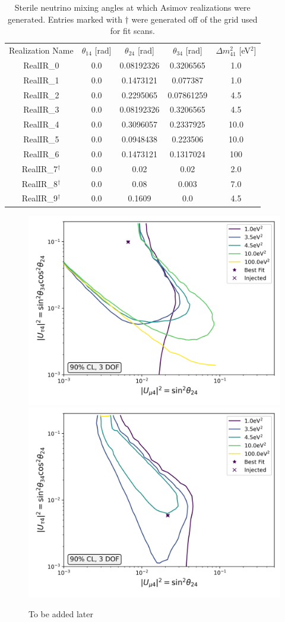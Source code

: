 \documentclass[main.tex]{subfiles}
\begin{document}
\begin{table}
    \centering
    \begin{tabular}{c | cccc}\rowcolor{blue!25}
            Realization Name & $\theta_{14}$ [rad] & $\theta_{24}$ [rad] & $\theta_{34}$ [rad] & $\Delta m_{41}^{2}$ [eV$^{2}$] \\
            RealIR\_0& 0.0  & 0.08192326 & 0.3206565 & 1.0 \\
            RealIR\_1& 0.0  & 0.1473121 & 0.077387 & 1.0\\
            RealIR\_2& 0.0  & 0.2295065 & 0.07861259 & 4.5\\
            RealIR\_3& 0.0  & 0.08192326 & 0.3206565 & 4.5\\
            RealIR\_4& 0.0  & 0.3096057 & 0.2337925 & 10.0\\
            RealIR\_5& 0.0  & 0.0948438 & 0.223506 & 10.0\\
            RealIR\_6& 0.0  & 0.1473121 & 0.1317024 & 100\\
            RealIR\_7$^{\dag}$ & 0.0  & 0.02 & 0.02 & 2.0\\
            RealIR\_8$^{\dag}$ & 0.0  & 0.08 & 0.003 & 7.0\\
            RealIR\_9$^{\dag}$ & 0.0  & 0.1609 & 0.0 & 4.5
    \end{tabular}
    \caption{Sterile neutrino mixing angles at which Asimov realizations were generated. Entries marked with $\dag$ were generated off of the grid used for fit scans.}\label{table:injected_signals}
\end{table}

\begin{figure}
    \centering
    \includegraphics[width=0.45\linewidth]{figures/inject_recover_RealIR_0_sterile_1_cl0.9_dof3.png}%
    \includegraphics[width=0.45\linewidth]{figures/inject_recover_RealIR_1_sterile_1_cl0.9_dof3.png}
    \caption{To be added later}
\end{figure}
\end{document}
